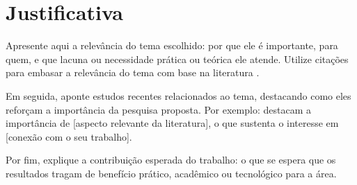 \chapter{Justificativa}

Apresente aqui a relevância do tema escolhido: por que ele é importante, para quem, e que lacuna ou necessidade prática ou teórica ele atende. Utilize citações para embasar a relevância do tema com base na literatura \cite{marconi2017metodologia}.

Em seguida, aponte estudos recentes relacionados ao tema, destacando como eles reforçam a importância da pesquisa proposta. Por exemplo:  destacam a importância de [aspecto relevante da literatura], o que sustenta o interesse em [conexão com o seu trabalho].

Por fim, explique a contribuição esperada do trabalho: o que se espera que os resultados tragam de benefício prático, acadêmico ou tecnológico para a área.
